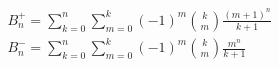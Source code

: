 \documentclass{standalone}
\renewenvironment{align*}{$\aligned}{\endaligned$}
\begin{document}
\begin{align*}
    &B^+_n = \sum_{k=0}^n\sum_{m=0}^k (-1)^m \binom{k}{m}\frac{(m+1)^n}{k+1}\\[1ex]
    &B^-_n = \sum_{k=0}^n\sum_{m=0}^k (-1)^m \binom{k}{m}\frac{m^n}{k+1}
\end{align*}
\end{document}

